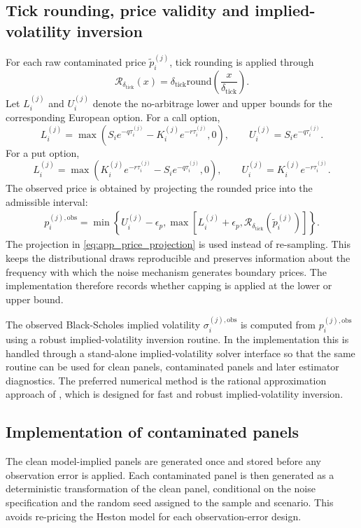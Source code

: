 \documentclass[11pt,a4paper,notitlepage]{article}
\numberwithin{equation}{section}
\begin{document}
\subsection{Tick rounding, price validity and implied-volatility inversion}
For each raw contaminated price $\tilde p_i^{(j)}$, tick rounding is applied through
\[
\mathcal{R}_{\delta_{\mathrm{tick}}}(x)
=
\delta_{\mathrm{tick}}
\mathrm{round}\left(\frac{x}{\delta_{\mathrm{tick}}}\right).
\]
Let $L_i^{(j)}$ and $U_i^{(j)}$ denote the no-arbitrage lower and upper bounds for the corresponding European
option. For a call option,
\[
L_i^{(j)}=\max\left(S_ie^{-q\tau_i^{(j)}}-K_i^{(j)}e^{-r\tau_i^{(j)}},0\right),
\qquad
U_i^{(j)}=S_ie^{-q\tau_i^{(j)}}.
\]
For a put option,
\[
L_i^{(j)}=\max\left(K_i^{(j)}e^{-r\tau_i^{(j)}}-S_ie^{-q\tau_i^{(j)}},0\right),
\qquad
U_i^{(j)}=K_i^{(j)}e^{-r\tau_i^{(j)}}.
\]
The observed price is obtained by projecting the rounded price into the admissible interval:
\begin{align}
p_i^{(j),\mathrm{obs}}
=
\min\left\{
U_i^{(j)}-\epsilon_p,
\max\left[
L_i^{(j)}+\epsilon_p,
\mathcal{R}_{\delta_{\mathrm{tick}}}\left(\tilde p_i^{(j)}\right)
\right]
\right\}.
\label{eq:app_price_projection}
\end{align}
The projection in \eqref{eq:app_price_projection} is used instead of re-sampling. This keeps the distributional
draws reproducible and preserves information about the frequency with which the noise mechanism generates boundary
prices. The implementation therefore records whether capping is applied at the lower or upper bound.

The observed Black-Scholes implied volatility $\sigma_i^{(j),\mathrm{obs}}$ is computed from
$p_i^{(j),\mathrm{obs}}$ using a robust implied-volatility inversion routine. In the implementation this is handled
through a stand-alone implied-volatility solver interface so that the same routine can be used for clean panels,
contaminated panels and later estimator diagnostics. The preferred numerical method is the rational approximation
approach of \citet{jaeckel2015lets}, which is designed for fast and robust implied-volatility inversion.

\subsection{Implementation of contaminated panels}
The clean model-implied panels are generated once and stored before any observation error is applied. Each
contaminated panel is then generated as a deterministic transformation of the clean panel, conditional on the
noise specification and the random seed assigned to the sample and scenario. This avoids re-pricing the Heston
model for each observation-error design.
\end{document}
